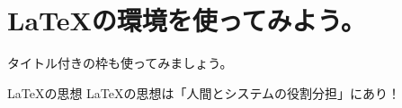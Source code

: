 \documentclass{ltjsarticle}
\begin{document}
\section{\LaTeX の環境を使ってみよう。}
タイトル付きの枠も使ってみましょう。
\begin{itembox}[l]{\LaTeX の思想}
\LaTeX の思想は「人間とシステムの役割分担」にあり！
\end{itembox}
\end{document}
